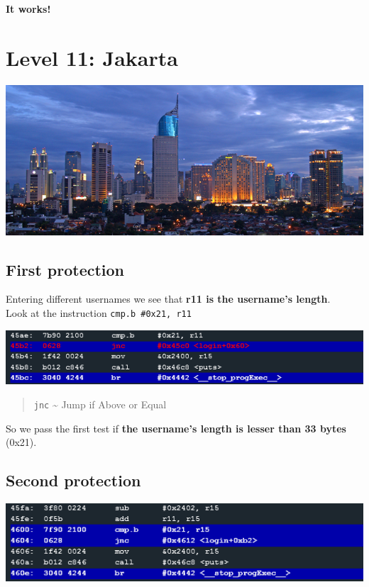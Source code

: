 \textbf{It works!}

\section{Level 11: Jakarta}\label{level-11-jakarta}

\includegraphics{img/11_6.PNG}

\subsection{First protection}\label{first-protection-1}

Entering different usernames we see that \textbf{r11 is the username's
length}.\\Look at the instruction \texttt{cmp.b \#0x21, r11}

\includegraphics{img/11_1.PNG}

\begin{quote}
\texttt{jnc} \textasciitilde{} Jump if Above or Equal
\end{quote}

So we pass the first test if \textbf{the username's length is lesser
than 33 bytes} (0x21).

\subsection{Second protection}\label{second-protection-1}

\includegraphics{img/11_2.PNG}

